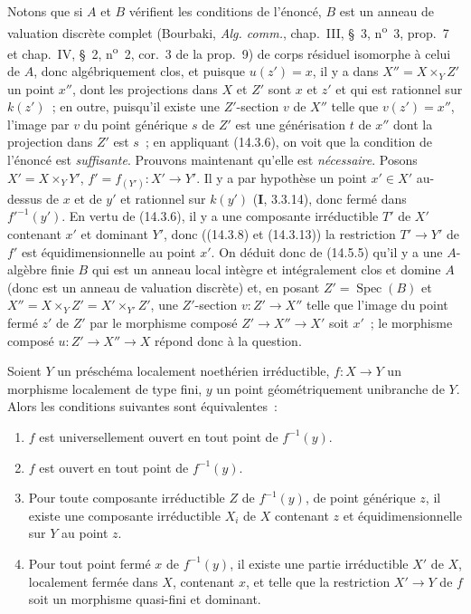 Notons que si $A$ et $B$ vérifient les conditions de l'énoncé, $B$ est un anneau
de valuation discrète complet (Bourbaki, \emph{Alg. comm.}, chap.~III, \S~3,
n\textsuperscript{o}~3, prop.~7 et chap.~IV, \S~2, n\textsuperscript{o}~2,
cor.~3 de la prop.~9) de corps résiduel isomorphe à celui de $A$, donc
algébriquement clos, et puisque $u(z')=x$, il y a dans $X''=X\times_Y Z'$ un point
$x''$, dont les projections dans $X$ et $Z'$ sont $x$ et $z'$ et qui est rationnel
sur $k(z')$~; en outre, puisqu'il existe une $Z'$-section $v$ de $X''$ telle que
$v(z')=x''$, l'image par $v$ du point générique $s$ de $Z'$ est une générisation
$t$ de $x''$ dont la projection dans $Z'$ est $s$~; en appliquant (14.3.6), on voit
que la condition de l'énoncé est \emph{suffisante}. Prouvons maintenant qu'elle est
\emph{nécessaire}. Posons $X'=X\times_Y Y'$, $f'=f_{(Y')}:X'\to Y'$. Il y a par
hypothèse un point $x'\in X'$ au-dessus de $x$ et de $y'$ et rationnel sur $k(y')$
(\textbf{I}, 3.3.14), donc fermé dans $f'^{-1}(y')$. En vertu de (14.3.6), il y a
une composante irréductible $T'$ de $X'$ contenant $x'$ et dominant $Y'$, donc
((14.3.8) et (14.3.13)) la restriction $T'\to Y'$ de $f'$ est équidimensionnelle au
point $x'$. On déduit donc de (14.5.5) qu'il y a une $A$-algèbre finie $B$ qui est
un anneau local intègre et intégralement clos et domine $A$ (donc est un anneau de
valuation discrète) et, en posant $Z'=\operatorname{Spec}(B)$ et
$X''=X\times_Y Z'=X'\times_{Y'}Z'$, une $Z'$-section $v:Z'\to X''$ telle que
l'image du point fermé $z'$ de $Z'$ par le morphisme composé $Z'\to X''\to X'$ soit
$x'$~; le morphisme composé $u:Z'\to X''\to X$ répond donc à la question.

\begin{proposition}[14.5.9]
\label{IV.14.5.9-fr}
Soient $Y$ un préschéma localement noethérien irréductible, $f:X\to Y$ un
morphisme localement de type fini, $y$ un point géométriquement unibranche de $Y$.
Alors les conditions suivantes sont équivalentes~:
\begin{enumerate}[label=\emph{\alph*)}]
  \item $f$ est universellement ouvert en tout point de $f^{-1}(y)$.
  \item $f$ est ouvert en tout point de $f^{-1}(y)$.
  \item Pour toute composante irréductible $Z$ de $f^{-1}(y)$, de point générique
  $z$, il existe une composante irréductible $X_i$ de $X$ contenant $z$ et
  équidimensionnelle sur $Y$ au point $z$.
  \item Pour tout point fermé $x$ de $f^{-1}(y)$, il existe une partie irréductible
  $X'$ de $X$, localement fermée dans $X$, contenant $x$, et telle que la
  restriction $X'\to Y$ de $f$ soit un morphisme quasi-fini et dominant.
\end{enumerate}
\end{proposition}

